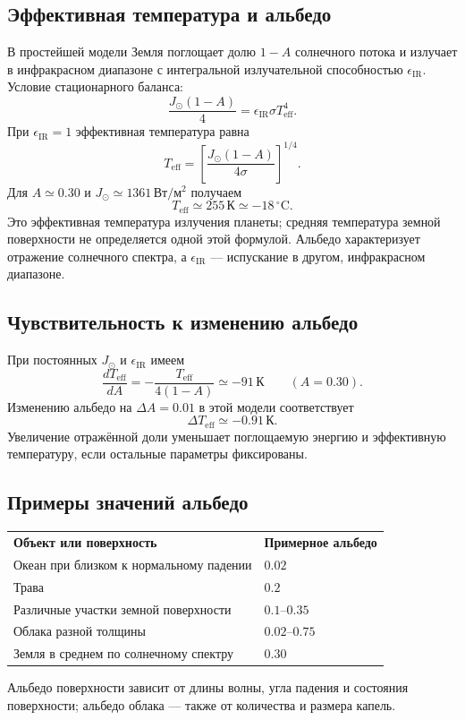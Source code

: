 \documentclass[../final.tex]{subfiles}
\begin{document}
\subsection{Эффективная температура и альбедо}
В простейшей модели Земля поглощает долю $1-A$ солнечного потока
и излучает в инфракрасном диапазоне с интегральной излучательной
способностью $\epsilon_{\mathrm{IR}}$. Условие стационарного баланса:
\begin{equation*}
 \frac{J_\odot(1-A)}4
 =\epsilon_{\mathrm{IR}}\sigma T_{\mathrm{eff}}^4.
\end{equation*}
При $\epsilon_{\mathrm{IR}}=1$ эффективная температура равна
\begin{equation*}
 T_{\mathrm{eff}}=
 \left[\frac{J_\odot(1-A)}{4\sigma}\right]^{1/4}.
\end{equation*}
Для $A\simeq0.30$ и $J_\odot\simeq1361\,\text{Вт}/\text{м}^2$ получаем
\begin{equation*}
 T_{\mathrm{eff}}\simeq255\,\text{К}\simeq-18\,^{\circ}\text{C}.
\end{equation*}
Это эффективная температура излучения планеты; средняя температура
земной поверхности не определяется одной этой формулой.
Альбедо характеризует отражение солнечного спектра,
а $\epsilon_{\mathrm{IR}}$ --- испускание в другом, инфракрасном диапазоне.

\subsection{Чувствительность к изменению альбедо}
При постоянных $J_\odot$ и $\epsilon_{\mathrm{IR}}$ имеем
\begin{equation*}
 \frac{dT_{\mathrm{eff}}}{dA}
 =-\frac{T_{\mathrm{eff}}}{4(1-A)}
 \simeq-91\,\text{К}\qquad(A=0.30).
\end{equation*}
Изменению альбедо на $\Delta A=0.01$ в этой модели соответствует
\begin{equation*}
 \Delta T_{\mathrm{eff}}\simeq-0.91\,\text{К}.
\end{equation*}
Увеличение отражённой доли уменьшает поглощаемую энергию и эффективную
температуру, если остальные параметры фиксированы.

\subsection{Примеры значений альбедо}
\begin{center}
\renewcommand{\arraystretch}{1.35}
\begin{tabular}{ll}
\textbf{Объект или поверхность}&\textbf{Примерное альбедо}\\
Океан при близком к нормальному падении&$0.02$\\
Трава&$0.2$\\
Различные участки земной поверхности&$0.1$--$0.35$\\
Облака разной толщины&$0.02$--$0.75$\\
Земля в среднем по солнечному спектру&$0.30$
\end{tabular}
\end{center}
Альбедо поверхности зависит от длины волны, угла падения и состояния
поверхности; альбедо облака --- также от количества и размера капель.
\end{document}
